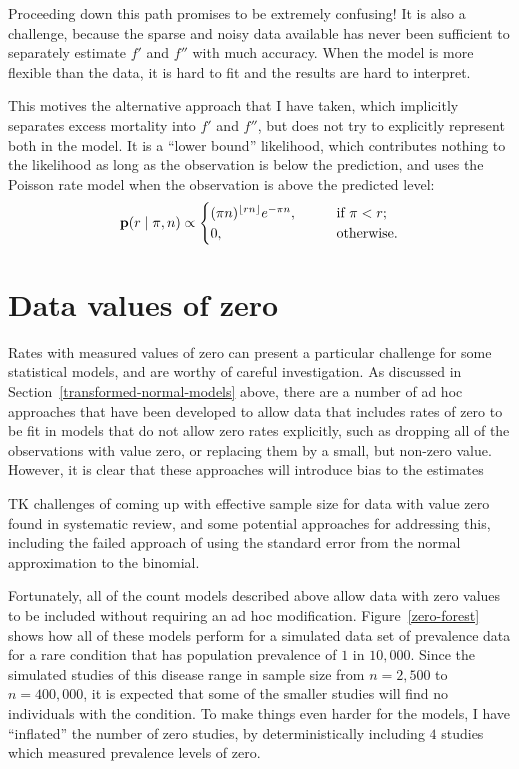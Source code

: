 Proceeding down this path promises to be extremely confusing!  It is
also a challenge, because the sparse and noisy data available has
never been sufficient to separately estimate $f'$ and $f''$ with much
accuracy.  When the model is more flexible than the data, it is hard
to fit and the results are hard to interpret.

This motives the alternative approach that I have taken, which
implicitly separates excess mortality into $f'$ and $f''$, but does
not try to explicitly represent both in the model.  It is a ``lower
bound'' likelihood, which contributes nothing to the likelihood as
long as the observation is below the prediction, and uses the Poisson
rate model when the observation is above the predicted level:
\[
\mathbf{p}(r \;|\; \pi,n) \propto
\begin{cases}
(\pi n)^{\lfloor rn\rfloor} e^{-\pi n}, &\qquad\text{if } \pi < r;\\
  0, &\qquad\text{otherwise.}
\end{cases} 
\]

\section{Data values of zero}
Rates with measured values of zero can present a particular challenge
for some statistical models, and are worthy of careful
investigation. As discussed in Section~\ref{transformed-normal-models}
above, there are a number of ad hoc approaches that have been
developed to allow data that includes rates of zero to be fit in
models that do not allow zero rates explicitly, such as dropping all
of the observations with value zero, or replacing them by a small, but
non-zero value. However, it is clear that these approaches will
introduce bias to the estimates \cite{refs TK}

TK challenges of coming up with effective sample size for data with
value zero found in systematic review, and some potential approaches
for addressing this, including the failed approach of using the
standard error from the normal approximation to the binomial.

Fortunately, all of the count models described above allow data with
zero values to be included without requiring an ad hoc
modification. Figure~\ref{zero-forest} shows how all of these models
perform for a simulated data set of prevalence data for a rare
condition that has population prevalence of $1$ in $10,000$.  Since
the simulated studies of this disease range in sample size from
$n=2,500$ to $n=400,000$, it is expected that some of the smaller
studies will find no individuals with the condition. To make things
even harder for the models, I have ``inflated'' the number of zero
studies, by deterministically including $4$ studies which measured
prevalence levels of zero.

